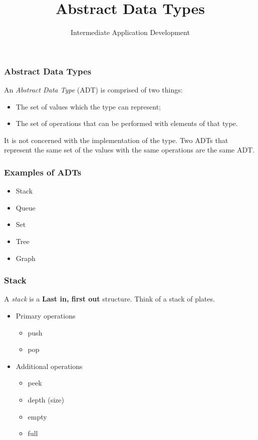 \documentclass[10pt]{beamer}
\title{Abstract Data Types}
\author[IN608]{Intermediate Application Development}
\institute[Otago Polytechnic]{
  Otago Polytechnic \\
  Dunedin, New Zealand \\
  Kaiako: Tom Clark
}
\date{}
\begin{document}
\begin{frame}[plain]
  \titlepage
\end{frame}

\begin{frame}
  \frametitle{Abstract Data Types}
   
   An \emph{Abstract Data Type} (ADT) is comprised of two things:
   \begin{itemize}
     \item The set of values which the type can represent;
	 \item The set of operations that can be performed with elements of that type.
   \end{itemize}
   
   It is not concerned with the implementation of the type. Two ADTs that
   represent the same set of the values with the same operations are the same
   ADT.
      
\end{frame}

\begin{frame}
  \frametitle{Examples of ADTs}
   
     \begin{itemize}
       \item Stack
	   \item Queue
	   \item Set
	   \item Tree
	   \item Graph
     \end{itemize}
\end{frame}

\begin{frame}
  \frametitle{Stack}
  A \emph{stack} is a \textbf{Last in, first out} structure. Think of
  a stack of plates.
  
    \begin{itemize}
       \item Primary operations
          \begin{itemize}
            \item push
            \item pop
          \end{itemize}  
	   \item Additional operations
	      \begin{itemize}
            \item peek
            \item depth (size)
            \item empty
            \item full
          \end{itemize}
     \end{itemize}
\end{frame}
\end{document}
